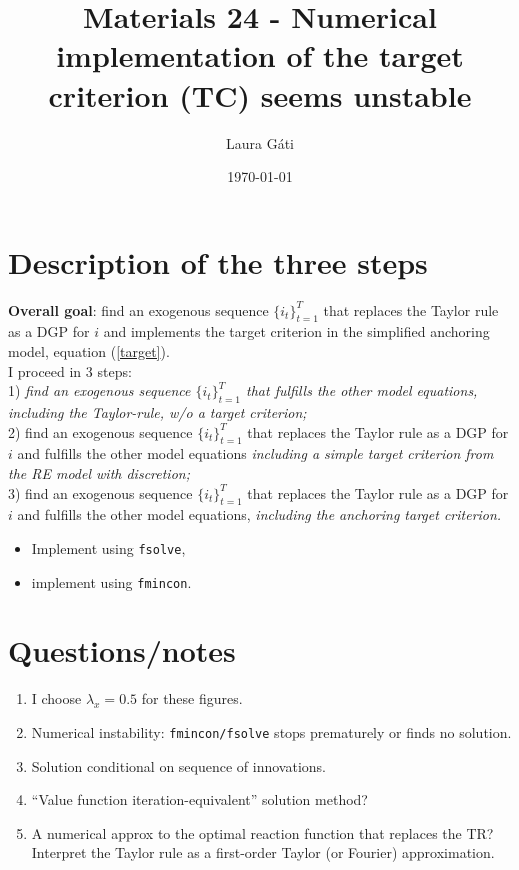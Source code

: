 \documentclass[11pt]{article}
\renewcommand{\[}{\begin{equation}}
\renewcommand{\]}{\end{equation}}
\begin{document}
\linespread{1.0}

\title{Materials 24 - Numerical implementation of the target criterion (TC) seems unstable}
\author{Laura G\'ati} 
\date{\today}
\maketitle


\tableofcontents


\newpage
\section{Description of the three steps}
\textbf{Overall goal}: find an exogenous sequence $\{i_t\}_{t=1}^{T}$ that replaces the Taylor rule as a DGP for $i$ and implements the target criterion in the simplified anchoring model, equation (\ref{target}).\\
I proceed in 3 steps: \\
1) \emph{find an exogenous sequence $\{i_t\}_{t=1}^{T}$ that fulfills the other model equations, including the Taylor-rule, w/o a target criterion;} \\
2) find an exogenous sequence $\{i_t\}_{t=1}^{T}$ that replaces the Taylor rule as a DGP for $i$ and fulfills the other model equations \emph{including a simple target criterion from the RE model with discretion;} \\
3) find an exogenous sequence $\{i_t\}_{t=1}^{T}$ that replaces the Taylor rule as a DGP for $i$ and fulfills the other model equations, \emph{including the anchoring target criterion.} \\
\begin{itemize}
\item Implement using \texttt{fsolve},
\item implement using \texttt{fmincon}.
\end{itemize}


\section{Questions/notes}
\begin{enumerate}
\item I choose $\lambda_x = 0.5$ for these figures.
\item Numerical instability: \texttt{fmincon/fsolve} stops prematurely or finds no solution.
\item Solution conditional on sequence of innovations.
\item ``Value function iteration-equivalent'' solution method?
\item A numerical approx to the optimal reaction function that replaces the TR? Interpret the Taylor rule as a first-order Taylor (or Fourier) approximation.
\end{enumerate}
\end{document}
